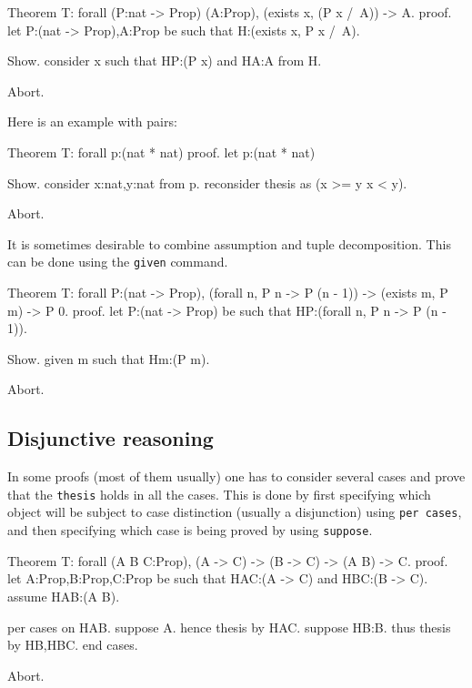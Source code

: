 \begin{coq_eval}
Theorem T: forall (P:nat -> Prop) (A:Prop), (exists x, (P x /\ A)) -> A.
proof.
let P:(nat -> Prop),A:Prop be such that H:(exists x, P x /\ A).
\end{coq_eval} 
\begin{coq_example}
Show.
consider x such that HP:(P x) and HA:A from H.
\end{coq_example}
\begin{coq_eval}
Abort.
\end{coq_eval}

Here is an example with pairs:

\begin{coq_eval}
Theorem T: forall p:(nat * nat)%
proof.
let p:(nat * nat)%
\end{coq_eval} 
\begin{coq_example}
Show.
consider x:nat,y:nat from p.
reconsider thesis as (x >= y \/ x < y). 
\end{coq_example}
\begin{coq_eval}
Abort.
\end{coq_eval}

It is sometimes desirable to combine assumption and tuple
decomposition. This can be done using the {\tt given} command.

\begin{coq_eval}
Theorem T: forall P:(nat -> Prop), (forall n, P n -> P (n - 1)) -> 
(exists m, P m) -> P 0.
proof.
let P:(nat -> Prop) be such that HP:(forall n, P n -> P (n - 1)).
\end{coq_eval} 
\begin{coq_example}
Show.
given m such that Hm:(P m).  
\end{coq_example}
\begin{coq_eval}
Abort.
\end{coq_eval}
 
\subsection{Disjunctive reasoning}

In some proofs (most of them usually) one has to consider several
cases and prove that the {\tt thesis} holds in all the cases. This is
done by first specifying which object will be subject to case
distinction (usually a disjunction) using {\tt per cases}, and then specifying which case is being proved by using {\tt suppose}.


\begin{coq_eval}
Theorem T: forall (A B C:Prop), (A -> C) -> (B -> C) -> (A \/ B) -> C.
proof.
let A:Prop,B:Prop,C:Prop be such that HAC:(A -> C) and HBC:(B -> C).
assume HAB:(A \/ B).
\end{coq_eval} 
\begin{coq_example}
per cases on HAB.
suppose A.
  hence thesis by HAC.
suppose HB:B.
  thus thesis by HB,HBC.
end cases.
\end{coq_example}
\begin{coq_eval}
Abort.
\end{coq_eval}

